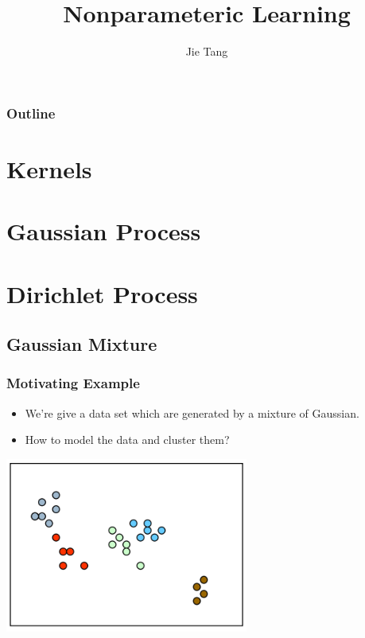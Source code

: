 \documentclass{beamer}
\title{Nonparameteric Learning}
\author{Jie Tang}
\begin{document}
\begin{frame}
\titlepage
\end{frame}

\begin{frame}
\frametitle{Outline}
\tableofcontents[pausesections]
\end{frame}

\section{Kernels}
\section{Gaussian Process}



\section{Dirichlet Process}

\subsection{Gaussian Mixture}
\begin{frame}
	\frametitle{Motivating Example}
	\begin{itemize}
		\item We're give a data set which are generated by a mixture of Gaussian.
		\item How to model the data and cluster them?
	\end{itemize}
	\centering
	\includegraphics[width=0.6\textwidth]{img/motive.png}
\end{frame}
\end{document}
